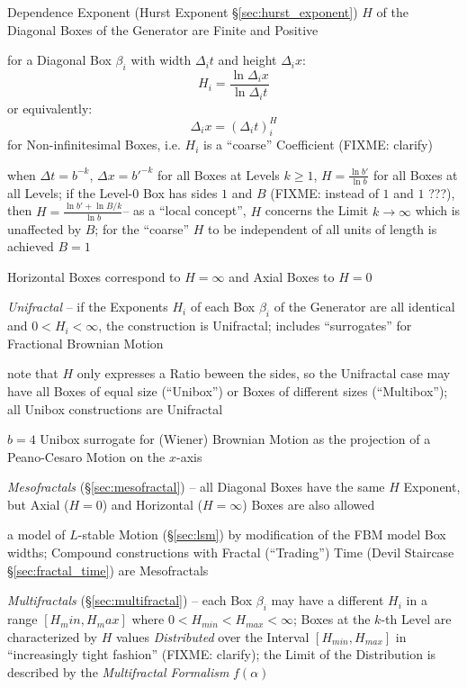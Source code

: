 Dependence Exponent (Hurst Exponent \S\ref{sec:hurst_exponent}) $H$ of the
Diagonal Boxes of the Generator are Finite and Positive

for a Diagonal Box $\beta_i$ with width $\Delta_i t$ and height $\Delta_i x$:
\[
  H_i = \frac{\ln \Delta_i x}{\ln \Delta_i t}
\]
or equivalently:
\[
  \Delta_i x = (\Delta_i t)^H_i
\]
for Non-infinitesimal Boxes, i.e. $H_i$ is a ``coarse'' Coefficient (FIXME:
clarify)

when $\Delta t = b^{-k}$, $\Delta x = b'^{-k}$ for all Boxes at Levels
$k \geq 1$, $H = \frac{\ln b'}{\ln b}$ for all Boxes at all Levels; if the
Level-0 Box has sides $1$ and $B$ (FIXME: instead of $1$ and $1$ ???),
then $H = \frac{\ln b' + \ln B/k}{\ln b}$-- as a ``local concept'', $H$ concerns
the Limit $k \to \infty$ which is unaffected by $B$; for the ``coarse'' $H$ to
be independent of all units of length is achieved $B = 1$

Horizontal Boxes correspond to $H = \infty$ and Axial Boxes to $H = 0$

\emph{Unifractal} -- if the Exponents $H_i$ of each Box $\beta_i$ of the
Generator are all identical and $0 < H_i < \infty$, the construction is
Unifractal; includes ``surrogates'' for Fractional Brownian Motion

note that $H$ only expresses a Ratio beween the sides, so the Unifractal case
may have all Boxes of equal size (``Unibox'') or Boxes of different sizes
(``Multibox''); all Unibox constructions are Unifractal

$b = 4$ Unibox surrogate for (Wiener) Brownian Motion as the projection of a
Peano-Cesaro Motion on the $x$-axis

\emph{Mesofractals} (\S\ref{sec:mesofractal}) -- all Diagonal Boxes have the
same $H$ Exponent, but Axial ($H = 0$) and Horizontal ($H = \infty$) Boxes are
also allowed

a model of $L$-stable Motion (\S\ref{sec:lsm}) by modification of the FBM model
Box widths; Compound constructions with Fractal (``Trading'') Time (Devil
Staircase \S\ref{sec:fractal_time}) are Mesofractals

\emph{Multifractals} (\S\ref{sec:multifractal}) -- each Box $\beta_i$ may have a
different $H_i$ in a range $[H_min, H_max]$ where
$0 < H_{min} < H_{max} < \infty$; Boxes at the $k$-th Level are characterized by
$H$ values \emph{Distributed} over the Interval $[H_{min}, H_{max}]$ in
``increasingly tight fashion'' (FIXME: clarify); the Limit of the Distribution
is described by the \emph{Multifractal Formalism} $f(\alpha)$

